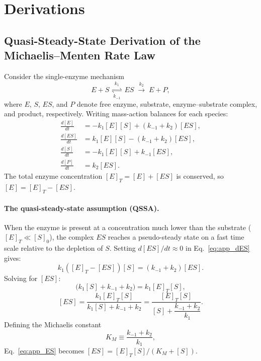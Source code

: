 \section{Derivations}\label{sec:appendix}

\subsection{Quasi-Steady-State Derivation of the Michaelis--Menten Rate Law}
\label{sec:mm_derivation}

Consider the single-enzyme mechanism
\begin{equation}\label{eq:app_mechanism}
  E + S \;\underset{k_{-1}}{\overset{k_1}{\rightleftharpoons}}\; ES
  \;\overset{k_2}{\longrightarrow}\; E + P,
\end{equation}
where $E$, $S$, $ES$, and $P$ denote free enzyme, substrate, enzyme--substrate
complex, and product, respectively.  Writing mass-action balances for each
species:
\begin{align}
  \frac{d[E]}{dt}  &= -k_1[E][S] + (k_{-1} + k_2)[ES], \label{eq:app_dE}\\
  \frac{d[ES]}{dt} &=  k_1[E][S] - (k_{-1} + k_2)[ES], \label{eq:app_dES}\\
  \frac{d[S]}{dt}  &= -k_1[E][S] + k_{-1}[ES],          \label{eq:app_dS}\\
  \frac{d[P]}{dt}  &=  k_2[ES].                          \label{eq:app_dP}
\end{align}
The total enzyme concentration $[E]_T = [E] + [ES]$ is conserved, so
$[E] = [E]_T - [ES]$.

\paragraph{The quasi-steady-state assumption (QSSA).}
When the enzyme is present at a concentration much lower than the substrate
($[E]_T \ll [S]_0$), the complex $ES$ reaches a pseudo-steady state on a
fast time scale relative to the depletion of $S$.  Setting
$d[ES]/dt \approx 0$ in Eq.~\eqref{eq:app_dES} gives:
\begin{equation}
  k_1([E]_T - [ES])[S] = (k_{-1} + k_2)[ES].
\end{equation}
Solving for $[ES]$:
\begin{equation}
  [ES]\bigl(k_1[S] + k_{-1} + k_2\bigr) = k_1[E]_T[S],
\end{equation}
\begin{equation}\label{eq:app_ES}
  [ES] = \frac{k_1[E]_T[S]}{k_1[S] + k_{-1} + k_2}
        = \frac{[E]_T[S]}{[S] + \dfrac{k_{-1}+k_2}{k_1}}.
\end{equation}
Defining the Michaelis constant
\begin{equation}\label{eq:KM_def}
  K_M \equiv \frac{k_{-1} + k_2}{k_1},
\end{equation}
Eq.~\eqref{eq:app_ES} becomes $[ES] = [E]_T[S]/(K_M + [S])$.

